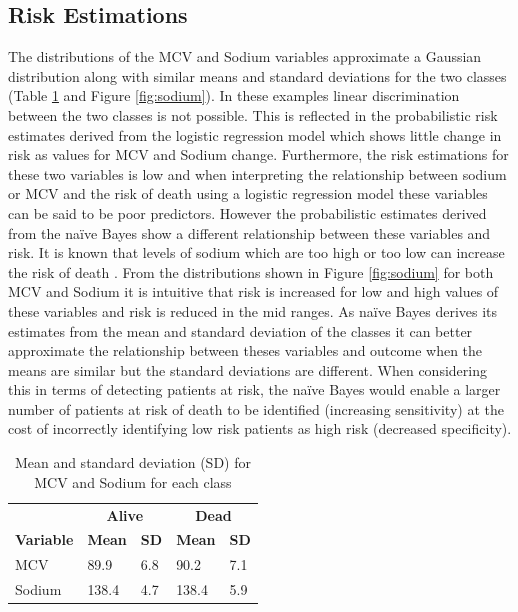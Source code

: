 \documentclass[a4paper,UKenglish]{oasics-v2016}
\begin{document}
\subsection*{Risk Estimations}
The distributions of the MCV and Sodium variables approximate a Gaussian distribution along with similar means and standard deviations for the two classes (Table \ref{table:means} and Figure \ref{fig:sodium}). In these examples linear discrimination between the two classes is not possible. This is reflected in the probabilistic risk estimates derived from the logistic regression model which shows little change in risk as values for MCV and Sodium change. Furthermore, the risk estimations for these two variables is low and when interpreting 
the relationship between sodium or MCV and the risk of death using a logistic regression model these variables can be said to be poor predictors. However the probabilistic estimates derived from the naïve Bayes show a different relationship between these variables and risk. It is known that levels of sodium which are too high or too low can increase the risk of death \cite{Bohacik2013}. From the distributions shown in Figure \ref{fig:sodium} for both MCV and Sodium it is intuitive that risk is increased for low and high values of these variables and risk is reduced in the mid ranges. As naïve Bayes derives its estimates from the mean and standard deviation of the classes it can better approximate the relationship between theses variables and outcome when the means are similar but the standard deviations are different. When considering this in terms of detecting patients at risk, the naïve Bayes would enable a larger number of patients at risk of death to be identified (increasing sensitivity) at the cost of incorrectly identifying low risk patients as high risk (decreased specificity). 


\begin{table}[h!]
\centering
\caption{Mean and standard deviation (SD) for MCV and Sodium for each class}
\label{table:means}
\begin{tabular}{lll|ll}
\hline
\textbf{}            & \multicolumn{2}{c|}{\textbf{Alive}}  & \multicolumn{2}{c}{\textbf{Dead}} \\

\textbf{Variable}        & \textbf{Mean}         & \textbf{SD}        & \textbf{Mean}         & \textbf{SD}         \\
\hline       
MCV     & 89.9        & 6.8       & 90.2        & 7.1       \\
Sodium  & 138.4        & 4.7       & 138.4        & 5.9       \\
\hline
\end{tabular}
\end{table}
\end{document}
